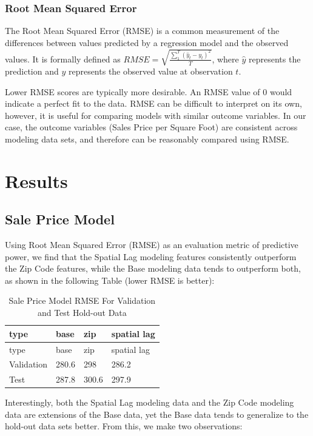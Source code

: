 \documentclass[12pt,]{article}
\begin{document}
\subsubsection{Root Mean Squared Error}\label{root-mean-squared-error}

The Root Mean Squared Error (RMSE) is a common measurement of the
differences between values predicted by a regression model and the
observed values. It is formally defined as
\(RMSE = \sqrt{ \frac{\sum_{1}^{T} (\hat{y}_t - y_t)^2}{T} }\), where
\(\hat{y}\) represents the prediction and \(y\) represents the observed
value at observation \(t\).

Lower RMSE scores are typically more desirable. An RMSE value of 0 would
indicate a perfect fit to the data. RMSE can be difficult to interpret
on its own, however, it is useful for comparing models with similar
outcome variables. In our case, the outcome variables (Sales Price per
Square Foot) are consistent across modeling data sets, and therefore can
be reasonably compared using RMSE.

\section{Results}\label{results}

\subsection{Sale Price Model}\label{sale-price-model}

Using Root Mean Squared Error (RMSE) as an evaluation metric of
predictive power, we find that the Spatial Lag modeling features
consistently outperform the Zip Code features, while the Base modeling
data tends to outperform both, as shown in the following Table (lower
RMSE is better):

\begin{longtable}[]{@{}llll@{}}
\caption{Sale Price Model RMSE For Validation and Test Hold-out
Data}\tabularnewline
\toprule
type & base & zip & spatial lag\tabularnewline
\midrule
\endfirsthead
\toprule
type & base & zip & spatial lag\tabularnewline
\midrule
\endhead
Validation & 280.6 & 298 & 286.2\tabularnewline
Test & 287.8 & 300.6 & 297.9\tabularnewline
\bottomrule
\end{longtable}

Interestingly, both the Spatial Lag modeling data and the Zip Code
modeling data are extensions of the Base data, yet the Base data tends
to generalize to the hold-out data sets better. From this, we make two
observations:
\end{document}
